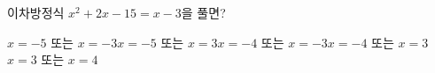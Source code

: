 이차방정식 $x^2+2x-15=x-3$을 풀면?
\begin{choicesv}{$x=-5$ 또는 $x=-3$}{$x=-5$ 또는 $x=3$}{$x=-4$ 또는 $x=-3$}{$x=-4$ 또는 $x=3$}{$x=3$ 또는 $x=4$}\end{choicesv}
